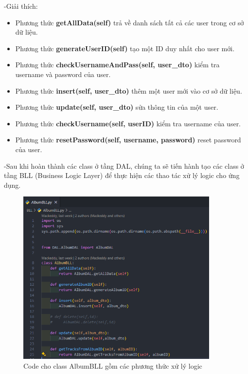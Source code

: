 \documentclass[a4paper]{article}
\begin{document}
\begin{flushleft}
	-Giải thích:
	\begin{itemize}
		\item Phương thức \textbf{getAllData(self)} trả về danh sách tất cả các user trong cơ sở dữ liệu.

		\item Phương thức \textbf{generateUserID(self)} tạo một ID duy nhất cho user mới.

		\item Phương thức \textbf{checkUsernameAndPass(self, user\_dto)} kiểm tra username và password của user.

		\item Phương thức \textbf{insert(self, user\_dto)} thêm một user mới vào cơ sở dữ liệu.

		\item Phương thức \textbf{update(self, user\_dto)} sửa thông tin của một user.

		\item Phương thức \textbf{checkUsername(self, userID)} kiểm tra username của user.

		\item Phương thức \textbf{resetPassword(self, username, password)} reset password của user.

	\end{itemize}
	-Sau khi hoàn thành các class ở tầng DAL, chúng ta sẽ tiến hành tạo các class ở tầng BLL (Business Logic Layer) để thực hiện các thao tác xử lý logic cho ứng dụng.
	\begin{figure}[h]
		\centering
		\includegraphics[width=0.9\textwidth]{images/AlbumBLL.png}
		\caption{Code cho class AlbumBLL gồm các phương thức xử lý logic}
	\end{figure}

\end{flushleft}
\end{document}

